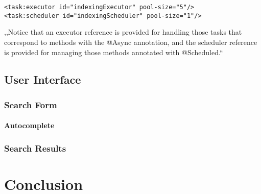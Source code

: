 \documentclass[12pt, oneside, a4paper]{book}
\begin{document}
\begin{verbatim}
<task:executor id="indexingExecutor" pool-size="5"/> 
<task:scheduler id="indexingScheduler" pool-size="1"/>
\end{verbatim}




,,Notice that an executor reference is provided for handling those
tasks that correspond to methods with the @Async annotation, and the
scheduler reference is provided for managing those methods annotated
with @Scheduled.``


\section{User Interface}

\subsection{Search Form}

\subsubsection{Autocomplete}

\subsection{Search Results}



\chapter{Conclusion}




\end{document}
